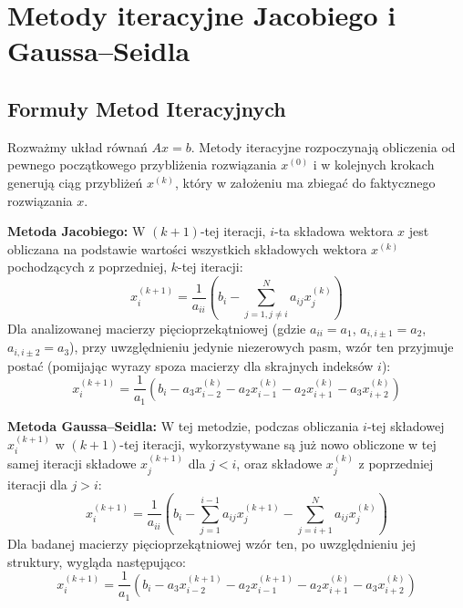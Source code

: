 \documentclass[a4paper, 11pt]{article}
\begin{document}
\section{Metody iteracyjne Jacobiego i Gaussa–Seidla}

\subsection{Formuły Metod Iteracyjnych}
Rozważmy układ równań $Ax=b$. Metody iteracyjne rozpoczynają obliczenia od pewnego początkowego przybliżenia rozwiązania $x^{(0)}$ i w kolejnych krokach generują ciąg przybliżeń $x^{(k)}$, który w założeniu ma zbiegać do faktycznego rozwiązania $x$.

\textbf{Metoda Jacobiego:} W $(k+1)$-tej iteracji, $i$-ta składowa wektora $x$ jest obliczana na podstawie wartości wszystkich składowych wektora $x^{(k)}$ pochodzących z poprzedniej, $k$-tej iteracji:
\begin{equation}
x_i^{(k+1)} = \frac{1}{a_{ii}} \left( b_i - \sum_{j=1, j \neq i}^{N} a_{ij} x_j^{(k)} \right)
\end{equation}
Dla analizowanej macierzy pięcioprzekątniowej (gdzie $a_{ii}=a_1$, $a_{i,i\pm 1}=a_2$, $a_{i,i\pm 2}=a_3$), przy uwzględnieniu jedynie niezerowych pasm, wzór ten przyjmuje postać (pomijając wyrazy spoza macierzy dla skrajnych indeksów $i$):
\begin{equation}
x_i^{(k+1)} = \frac{1}{a_1} \left( b_i - a_3 x_{i-2}^{(k)} - a_2 x_{i-1}^{(k)} - a_2 x_{i+1}^{(k)} - a_3 x_{i+2}^{(k)} \right)
\label{eq:jacobi_sparse}
\end{equation}

\textbf{Metoda Gaussa–Seidla:} W tej metodzie, podczas obliczania $i$-tej składowej $x_i^{(k+1)}$ w $(k+1)$-tej iteracji, wykorzystywane są już nowo obliczone w tej samej iteracji składowe $x_j^{(k+1)}$ dla $j < i$, oraz składowe $x_j^{(k)}$ z poprzedniej iteracji dla $j > i$:
\begin{equation}
x_i^{(k+1)} = \frac{1}{a_{ii}} \left( b_i - \sum_{j=1}^{i-1} a_{ij} x_j^{(k+1)} - \sum_{j=i+1}^{N} a_{ij} x_j^{(k)} \right)
\end{equation}
Dla badanej macierzy pięcioprzekątniowej wzór ten, po uwzględnieniu jej struktury, wygląda następująco:
\begin{equation}
x_i^{(k+1)} = \frac{1}{a_1} \left( b_i - a_3 x_{i-2}^{(k+1)} - a_2 x_{i-1}^{(k+1)} - a_2 x_{i+1}^{(k)} - a_3 x_{i+2}^{(k)} \right)
\label{eq:gauss_seidel_sparse}
\end{equation}
\end{document}
